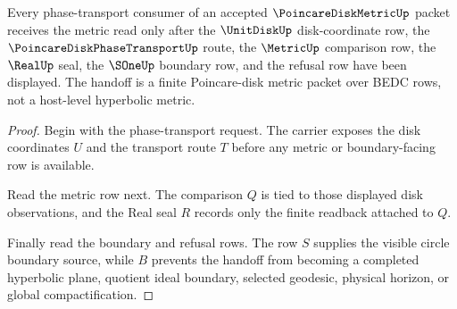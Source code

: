 \begin{theorem}
\label{thm:poincare-disk-metric-phase-transport-handoff}
Every phase-transport consumer of an accepted $\PoincareDiskMetricUp$ packet receives the metric read only after the $\UnitDiskUp$ disk-coordinate row, the $\PoincareDiskPhaseTransportUp$ route, the $\MetricUp$ comparison row, the $\RealUp$ seal, the $\SOneUp$ boundary row, and the refusal row have been displayed. The handoff is a finite Poincare-disk metric packet over BEDC rows, not a host-level hyperbolic metric.
\end{theorem}
\begin{proof}
Begin with the phase-transport request. The carrier exposes the disk coordinates $U$ and the transport route $T$ before any metric or boundary-facing row is available.

Read the metric row next. The comparison $Q$ is tied to those displayed disk observations, and the Real seal $R$ records only the finite readback attached to $Q$.

Finally read the boundary and refusal rows. The row $S$ supplies the visible circle boundary source, while $B$ prevents the handoff from becoming a completed hyperbolic plane, quotient ideal boundary, selected geodesic, physical horizon, or global compactification.
\end{proof}




